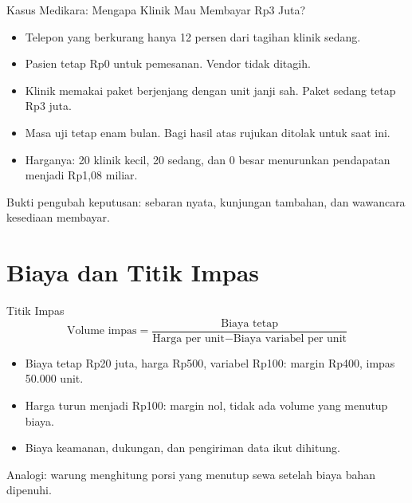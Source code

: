 \documentclass[aspectratio=169, table, 12pt]{beamer}
\begin{document}
\begin{frame}{{\Large Kasus Medikara: Mengapa Klinik Mau Membayar Rp3 Juta?}}
  \vspace{6pt}
  \begin{itemize}
    \item Telepon yang berkurang hanya 12 persen dari tagihan klinik sedang.
    \item Pasien tetap Rp0 untuk pemesanan. Vendor tidak ditagih.
    \item Klinik memakai paket berjenjang dengan unit janji sah. Paket sedang tetap Rp3 juta.
    \item Masa uji tetap enam bulan. Bagi hasil atas rujukan ditolak untuk saat ini.
    \item Harganya: 20 klinik kecil, 20 sedang, dan 0 besar menurunkan pendapatan menjadi Rp1,08 miliar.
  \end{itemize}
  \vspace{4pt}
  {\small Bukti pengubah keputusan: sebaran nyata, kunjungan tambahan, dan wawancara kesediaan membayar.}
\end{frame}

\section{Biaya dan Titik Impas}

\begin{frame}{{\Large Titik Impas}}
  \vspace{4pt}
  \[
    \text{Volume impas} = \frac{\text{Biaya tetap}}{\text{Harga per unit} - \text{Biaya variabel per unit}}
  \]
  \begin{itemize}
    \item Biaya tetap Rp20 juta, harga Rp500, variabel Rp100: margin Rp400, impas 50.000 unit.
    \item Harga turun menjadi Rp100: margin nol, tidak ada volume yang menutup biaya.
    \item Biaya keamanan, dukungan, dan pengiriman data ikut dihitung.
  \end{itemize}
  \vspace{4pt}
  {\small Analogi: warung menghitung porsi yang menutup sewa setelah biaya bahan dipenuhi.}
\end{frame}
\end{document}
